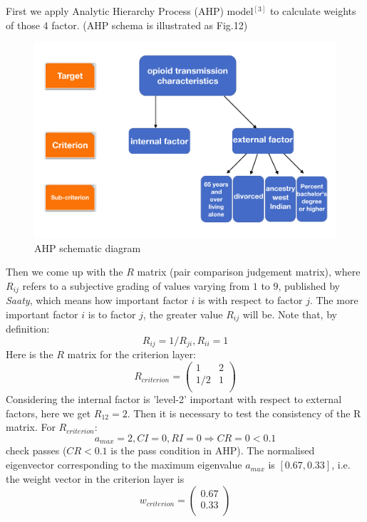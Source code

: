 \documentclass[12pt]{article}
\begin{document}
First we apply Analytic Hierarchy Process (AHP) model$^{[3]}$ to calculate weights of those 4 factor. (AHP schema is illustrated as Fig.12)
\begin{figure}[!htbp]
\small
\centering
\includegraphics[width=14cm]{Fig/AHPmap}
\caption{AHP schematic diagram}
\end{figure}

Then we come up with the $R$ matrix (pair comparison judgement matrix), where $R_{ij}$ refers to a subjective grading of values varying from $1$ to $9$, published by \textit{Saaty}, which means how important factor $i$ is with respect to factor $j$. The more important factor $i$ is to factor $j$, the greater value $R_{ij}$ will be. Note that, by definition:
$$R_{ij} = 1 / R_{ji}, R_{ii} = 1$$
Here is the $R$ matrix for the criterion layer:
$$ R_{criterion} =
  \begin{pmatrix}
  {1} & {2}  \\
  {1/2} & {1}  \\
  \end{pmatrix}
$$
Considering the internal factor is 'level-2' important with respect to external factors, here we get $R_{12} = 2$. Then it is necessary to test the consistency of the R matrix. For $R_{criterion}$:
$$
a_{max}=2, CI=0, RI=0 \Rightarrow CR = 0 < 0.1
$$
check passes ($CR<0.1$ is the pass condition in AHP). The normalised eigenvector corresponding to the maximum eigenvalue $a_{max}$ is $[0.67, 0.33]$, i.e. the weight vector in the criterion layer is
$$ w_{criterion} =
  \begin{pmatrix}
  0.67  \\
  0.33  \\
  \end{pmatrix}
$$
\end{document}
